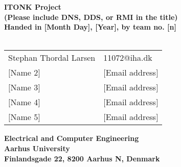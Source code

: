 \begin{titlepage}
\begin{center}
{\LARGE \textbf{ITONK Project}}\\
{\large \textbf{(Please include DNS, DDS, or RMI in the title)}}\\
\textbf{Handed in [Month Day], [Year], by team no. [n]}\\~\\
\begin{tabular}{ll}
Stephan Thordal Larsen  & 11072@iha.dk \\
$[$Name 2$]$  & $[$Email address$]$ \\
$[$Name 3$]$  & $[$Email address$]$ \\
$[$Name 4$]$  & $[$Email address$]$ \\
$[$Name 5$]$  & $[$Email address$]$ \\
\end{tabular}
\vfill
\textbf{Electrical and Computer Engineering}\\
\textbf{Aarhus University}\\
\textbf{Finlandsgade 22, 8200 Aarhus N, Denmark}
\end{center}
\end{titlepage}